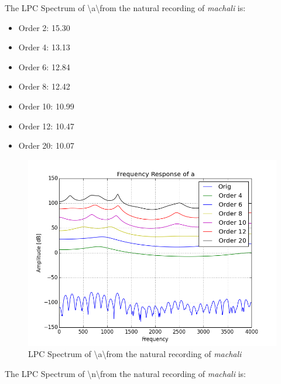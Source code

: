 \documentclass[a4paper]{article}
\begin{document}
The LPC Spectrum of \textbackslash a\textbackslash from the natural recording of \textit{machali} is: 
\begin{itemize}
\item Order 2: 15.30 
\item Order 4: 13.13
\item Order 6: 12.84
\item Order 8: 12.42
\item Order 10: 10.99
\item Order 12: 10.47
\item Order 20: 10.07
\end{itemize}    

\begin{figure}[h!]
    \includegraphics[width=\linewidth]{./images/freq_resp_a.png}
    \caption{LPC Spectrum of \textbackslash a\textbackslash from the natural recording of \textit{machali}}
    \label{fig:1}
\end{figure}

 

The LPC Spectrum of \textbackslash n\textbackslash from the natural recording of \textit{machali} is: 
\end{document}
